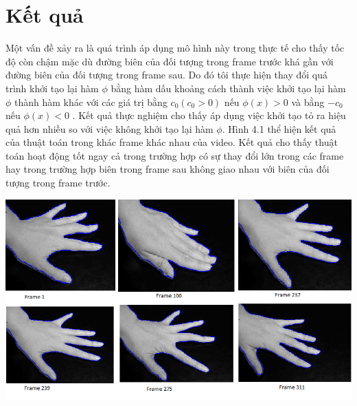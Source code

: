 \documentclass[12pt, oneside, a4paper]{book}
\begin{document}
\section{Kết quả}
Một vấn đề xảy ra là quá trình áp dụng  mô hình này  trong thực tế cho thấy tốc độ còn chậm mặc dù đường biên của đối tượng trong frame trước khá gần với đường biên của đối tượng trong frame sau. Do đó tôi thực hiện thay đổi quá trình khởi tạo lại hàm $\phi$ bằng hàm dấu khoảng cách thành việc khởi tạo lại hàm $\phi$ thành hàm khác với các giá trị bằng $c_0(c_0>0)$ nếu $\phi(x)>0$ và bằng $-c_0$ nếu $\phi(x)<0$ . Kết quả thực nghiệm cho thấy áp dụng việc khởi tạo  tỏ ra hiệu quả hơn nhiều so với việc không khởi tạo lại hàm $\phi$. Hình 4.1 thể hiện kết quả của thuật toán trong khác frame khác nhau của video. Kết quả cho thấy thuật toán hoạt động tốt ngay cả trong trường hợp có sự thay đổi lớn trong các frame hay trong trường hợp biên trong frame sau không giao nhau với biên của đối tượng trong frame trước.
\begin{center}
\includegraphics[scale=0.5]{figure/video1.png}
\end{center}   
\end{document}
